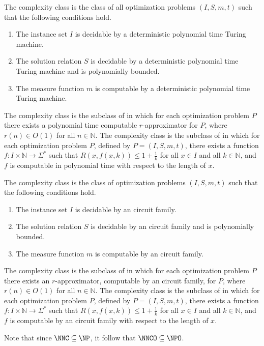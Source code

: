 \documentclass[]{article}
\begin{document}
The complexity class \NPO{} is the class of all optimization problems $(I, S, m, t)$ such that the following conditions hold.
\begin{enumerate}
\item The instance set $I$ is decidable by a deterministic polynomial time Turing machine.
\item The solution relation $S$ is decidable by a deterministic polynomial time Turing machine and is polynomially bounded.
\item The measure function $m$ is computable by a deterministic polynomial time Turing machine.
\end{enumerate}
The complexity class \APX{} is the subclass of \NPO{} in which for each optimization problem $P$ there exists a polynomial time computable $r$-approximator for $P$, where $r(n) \in O(1)$ for all $n \in \mathbb{N}$.
The complexity class \PTAS{} is the subclass of \APX{} in which for each optimization problem $P$, defined by $P = (I, S, m, t)$, there exists a function $f \colon I \times \mathbb{N} \to \Sigma^*$ such that $R(x, f(x, k)) \leq 1 + \frac{1}{k}$ for all $x \in I$ and all $k \in \mathbb{N}$, and $f$ is computable in polynomial time with respect to the length of $x$.

The complexity class \NNCO{} is the class of optimization problems $(I, S, m, t)$ such that the following conditions hold.
\begin{enumerate}
\item The instance set $I$ is decidable by an \NC{} circuit family.
\item The solution relation $S$ is decidable by an \NC{} circuit family and is polynomially bounded.
\item The measure function $m$ is computable by an \FNC{} circuit family.
\end{enumerate}
The complexity class \NCX{} is the subclass of \NNCO{} in which for each optimization problem $P$ there exists an $r$-approximator, computable by an \FNC{} circuit family, for $P$, where $r(n) \in O(1)$ for all $n \in \mathbb{N}$.
The complexity class \NCAS{} is the subclass of \NCX{} in which for each optimization problem $P$, defined by $P = (I, S, m, t)$, there exists a function $f \colon I \times \mathbb{N} \to \Sigma^*$ such that $R(x, f(x, k)) \leq 1 + \frac{1}{k}$ for all $x \in I$ and all $k \in \mathbb{N}$, and $f$ is computable by an \FNC{} circuit family with respect to the length of $x$.

Note that since $\NNC \subseteq \NP$, it follow that $\NNCO \subseteq \NPO$.
\end{document}
